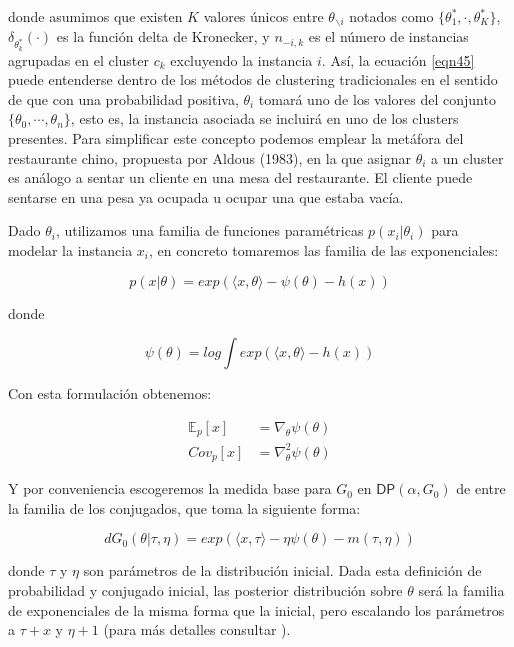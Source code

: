 donde asumimos que existen $K$ valores únicos entre $\theta_{\backslash i}$ notados como $\{\theta_{1}^*, \cdot, \theta_{K}^*\}$, $\delta_{\theta_{k}^*}(\cdot)$ es la función delta de Kronecker, y $n_{-i,k}$ es el número de instancias agrupadas en el cluster $c_k$ excluyendo la instancia $i$. Así, la ecuación \ref{eqn45} puede entenderse dentro de los métodos de clustering tradicionales en el sentido de que con una probabilidad positiva, $\theta_i$ tomará uno de los valores del conjunto $\{\theta_0, \cdots, \theta_n\}$, esto es, la instancia asociada se incluirá en uno de los clusters presentes. Para simplificar este concepto podemos emplear la metáfora del restaurante chino, propuesta por Aldous (1983), en la que asignar $\theta_i$ a un cluster es análogo a sentar un cliente en una mesa del restaurante. El cliente puede sentarse en una pesa ya ocupada u ocupar una que estaba vacía.

Dado $\theta_i$, utilizamos una familia de funciones paramétricas $p(x_i|\theta_i)$ para modelar la instancia $x_i$, en concreto tomaremos las familia de las exponenciales:

\begin{equation}
p(x|\theta) = exp(\langle x, \theta \rangle - \psi(\theta) - h(x))
\label{eqn46}
\end{equation}

donde 

\begin{equation}
\psi(\theta) = log \int exp(\langle x, \theta \rangle - h(x))
\label{eqn47}
\end{equation}

Con esta formulación obtenemos:

\begin{equation}
\begin{split}
\mathbb{E}_p[x] &= \nabla_{\theta} \psi(\theta) \\
Cov_p[x] &= \nabla_{\theta}^2 \psi(\theta)
\end{split}
\label{eqn48}
\end{equation}

Y por conveniencia escogeremos la medida base para $G_0$ en $\mathsf{DP}(\alpha, G_0)$ de entre la familia de los conjugados, que toma la siguiente forma:

\begin{equation}
d G_0(\theta| \tau, \eta) = exp(\langle x, \tau \rangle - \eta\psi(\theta) - m(\tau, \eta))
\label{eqn49}
\end{equation}

donde $\tau$ y $\eta$ son parámetros de la distribución inicial. Dada esta definición de probabilidad y conjugado inicial, las posterior distribución sobre $\theta$ será la familia de exponenciales de la misma forma que la inicial, pero escalando los parámetros a $\tau + x$ y $\eta + 1$ (para más detalles consultar \cite{RDPM:2015}).

